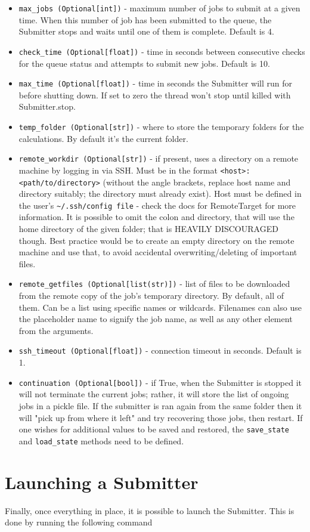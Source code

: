 \documentclass[]{report}
\begin{document}
\begin{itemize}
	\item \lstinline|max_jobs (Optional[int])| - maximum number of jobs to submit at a given time. When this number of job has been submitted to the queue, the Submitter stops and waits until one of them is complete. Default is 4.
	\item \lstinline|check_time (Optional[float])| - time in seconds between consecutive checks for the queue status and attempts to submit new jobs. Default is 10.
	\item \lstinline|max_time (Optional[float])| - time in seconds the Submitter will run for before shutting down. If set to zero the thread won't stop until killed with Submitter.stop.
	\item \lstinline|temp_folder (Optional[str])| - where to store the temporary folders for the calculations. By default it's the current folder.
	\item \lstinline|remote_workdir (Optional[str])| - if present, uses a directory on a remote machine by logging in via SSH. Must be in the format \lstinline|<host>:<path/to/directory>| (without the angle brackets, replace host name and directory suitably; the directory must already exist). Host must be defined in the user's \lstinline|~/.ssh/config file| - check the docs for RemoteTarget for more information. It is possible to omit the colon and directory, that will use the home directory of the given folder; that is HEAVILY DISCOURAGED though. Best practice would be to create an empty directory on the remote machine and use that, to avoid accidental overwriting/deleting of important files.
	\item \lstinline|remote_getfiles (Optional[list(str)])| - list of files to be downloaded from the remote copy of the job's temporary directory. By default, all of them. Can be a list using specific names or wildcards. Filenames can also use the placeholder {name} to signify the job name, as well as any other element from the arguments.
	\item \lstinline|ssh_timeout (Optional[float])| - connection timeout in seconds. Default is 1.
	\item \lstinline|continuation (Optional[bool])| - if True, when the Submitter is stopped it will not terminate the current jobs; rather, it will store the list of ongoing jobs in a pickle file. If the submitter is ran again from the same folder then it will "pick up from where it left" and try recovering those jobs, then restart. If one wishes for additional values to be saved and restored, the \lstinline|save_state| and \lstinline|load_state| methods need to be defined.
\end{itemize}

\section{Launching a Submitter}

Finally, once everything in place, it is possible to launch the Submitter. This is done by running the following command
\end{document}
